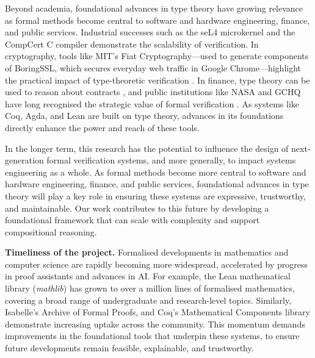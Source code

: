 \documentclass[a4paper,11pt]{article}
\renewcommand{\paragraph}[1]{\textbf{#1.}}
\begin{document}
Beyond academia, foundational advances in type theory have growing relevance as formal methods become central to software and hardware engineering, finance, and public services. Industrial successes such as the seL4 microkernel \cite{klein2014} and the CompCert C compiler \cite{Leroy2009} demonstrate the scalability of verification. In cryptography, tools like MIT’s Fiat Cryptography—used to generate components of BoringSSL, which secures everyday web traffic in Google Chrome—highlight the practical impact of type-theoretic verification \cite{Chlipala2019}. In finance, type theory can be used to reason about contracts \cite{PeytonJones2000}, and public institutions like NASA and GCHQ have long recognised the strategic value of formal verification \cite{Rushby1993}. As systems like Coq, Agda, and Lean are built on type theory, advances in its foundations directly enhance the power and reach of these tools.

In the longer term, this research has the potential to influence the
design of next-generation formal verification systems, and more
generally, to impact systems engineering as a whole. As formal methods
become more central to software and hardware engineering, finance, and
public services, foundational advances in type theory will play a key
role in ensuring these systems are expressive, trustworthy, and
maintainable. Our work contributes to this future by developing a
foundational framework that can scale with complexity and support
compositional reasoning.

\paragraph{Timeliness of the project}
%
%
Formalised developments in mathematics and computer science are
rapidly becoming more widespread, accelerated by progress in proof
assistants and advances in AI. For example, the Lean mathematical
library (\emph{mathlib}) has grown to over a million lines of
formalised mathematics, covering a broad range of undergraduate and
research-level topics. Similarly, 
Isabelle’s Archive of Formal Proofs, and Coq’s Mathematical Components
library demonstrate increasing uptake across the community. This
momentum demands improvements in the foundational tools that underpin
these systems, to ensure future developments remain feasible,
explainable, and trustworthy.
\end{document}
